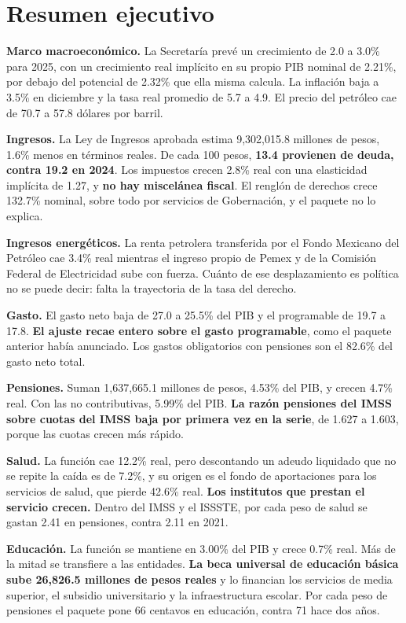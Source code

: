 \chapter*{Resumen ejecutivo}

\textbf{Marco macroeconómico.} La Secretaría prevé un crecimiento de 2.0 a 3.0\%
para 2025, con un crecimiento real implícito en su propio PIB nominal de 2.21\%,
por debajo del potencial de 2.32\% que ella misma calcula. La inflación baja a
3.5\% en diciembre y la tasa real promedio de 5.7 a 4.9. El precio del petróleo
cae de 70.7 a 57.8 dólares por barril.

\textbf{Ingresos.} La Ley de Ingresos aprobada estima 9,302,015.8 millones de
pesos, 1.6\% menos en términos reales. De cada 100 pesos, \textbf{13.4 provienen
de deuda, contra 19.2 en 2024}. Los impuestos crecen 2.8\% real con una
elasticidad implícita de 1.27, y \textbf{no hay miscelánea fiscal}. El renglón de
derechos crece 132.7\% nominal, sobre todo por servicios de Gobernación, y el
paquete no lo explica.

\textbf{Ingresos energéticos.} La renta petrolera transferida por el Fondo
Mexicano del Petróleo cae 3.4\% real mientras el ingreso propio de Pemex y de la
Comisión Federal de Electricidad sube con fuerza. Cuánto de ese desplazamiento es
política no se puede decir: falta la trayectoria de la tasa del derecho.

\textbf{Gasto.} El gasto neto baja de 27.0 a 25.5\% del PIB y el programable de
19.7 a 17.8. \textbf{El ajuste recae entero sobre el gasto programable}, como el
paquete anterior había anunciado. Los gastos obligatorios con pensiones son el
82.6\% del gasto neto total.

\textbf{Pensiones.} Suman 1,637,665.1 millones de pesos, 4.53\% del PIB, y crecen
4.7\% real. Con las no contributivas, 5.99\% del PIB. \textbf{La razón pensiones
del IMSS sobre cuotas del IMSS baja por primera vez en la serie}, de 1.627 a
1.603, porque las cuotas crecen más rápido.

\textbf{Salud.} La función cae 12.2\% real, pero descontando un adeudo liquidado
que no se repite la caída es de 7.2\%, y su origen es el fondo de aportaciones
para los servicios de salud, que pierde 42.6\% real. \textbf{Los institutos que
prestan el servicio crecen.} Dentro del IMSS y el ISSSTE, por cada peso de salud
se gastan 2.41 en pensiones, contra 2.11 en 2021.

\textbf{Educación.} La función se mantiene en 3.00\% del PIB y crece 0.7\% real.
Más de la mitad se transfiere a las entidades. \textbf{La beca universal de
educación básica sube 26,826.5 millones de pesos reales} y lo financian los
servicios de media superior, el subsidio universitario y la infraestructura
escolar. Por cada peso de pensiones el paquete pone 66 centavos en educación,
contra 71 hace dos años.

